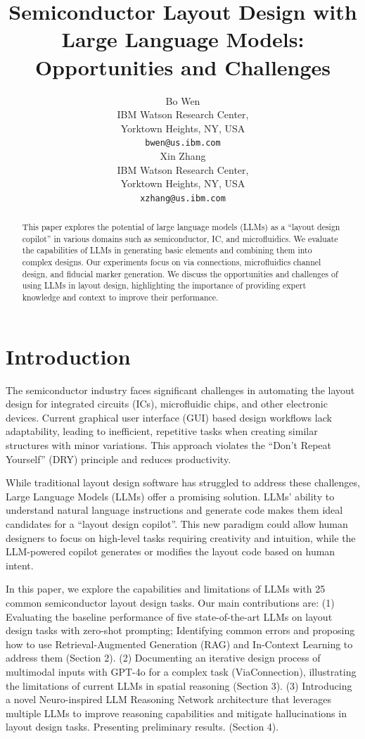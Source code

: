 \documentclass{article}
\title{Semiconductor Layout Design with Large Language Models: Opportunities and Challenges}
\author{%
  Bo Wen\\
  IBM Watson Research Center, \\
  Yorktown Heights, NY, USA \\
  \texttt{bwen@us.ibm.com} \\
  \And
  Xin Zhang\\
  IBM Watson Research Center, \\
  Yorktown Heights, NY, USA \\
  \texttt{xzhang@us.ibm.com} \\
}
\begin{document}
\maketitle

\begin{abstract}
  This paper explores the potential of large language models (LLMs) as a ``layout design copilot'' in various domains such as semiconductor, IC, and microfluidics. We evaluate the capabilities of LLMs in generating basic elements and combining them into complex designs. Our experiments focus on via connections, microfluidics channel design, and fiducial marker generation. We discuss the opportunities and challenges of using LLMs in layout design, highlighting the importance of providing expert knowledge and context to improve their performance.
\end{abstract}

\section{Introduction}
The semiconductor industry faces significant challenges in automating the layout design for integrated circuits (ICs), microfluidic chips, and other electronic devices. Current graphical user interface (GUI) based design workflows lack adaptability, leading to inefficient, repetitive tasks when creating similar structures with minor variations.\cite{Greengard2024-hx} This approach violates the ``Don't Repeat Yourself'' (DRY) principle and reduces productivity.

While traditional layout design software has struggled to address these challenges, Large Language Models (LLMs) offer a promising solution. LLMs' ability to understand natural language instructions and generate code makes them ideal candidates for a ``layout design copilot''. This new paradigm could allow human designers to focus on high-level tasks requiring creativity and intuition, while the LLM-powered copilot generates or modifies the layout code based on human intent.

In this paper, we explore the capabilities and limitations of LLMs with 25 common semiconductor layout design tasks. Our main contributions are: 
(1) Evaluating the baseline performance of five state-of-the-art LLMs on layout design tasks with zero-shot prompting; Identifying common errors and proposing how to use Retrieval-Augmented Generation (RAG) and In-Context Learning to address them (Section 2). 
(2) Documenting an iterative design process of multimodal inputs with GPT-4o for a complex task (ViaConnection), illustrating the limitations of current LLMs in spatial reasoning (Section 3). 
(3) Introducing a novel Neuro-inspired LLM Reasoning Network architecture that leverages multiple LLMs to improve reasoning capabilities and mitigate hallucinations in layout design tasks. Presenting preliminary results. (Section 4).
\end{document}
